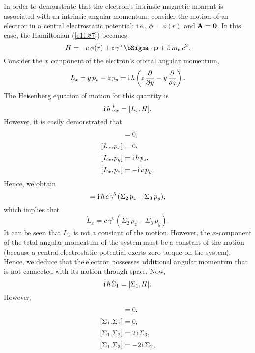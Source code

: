  In order to demonstrate that the electron's intrinsic magnetic moment is associated with an intrinsic angular momentum,
  consider the motion of an electron in a central electrostatic potential: i.e., $\phi=\phi(r)$ and ${\bf A}={\bf 0}$. 
In this case, the Hamiltonian (\ref{e11.87}) becomes
\begin{equation}
H = - e\,\phi(r) + c\,\gamma^5\,\bSigma\cdot{\bf p} + \beta\,m_e\,c^2.
\end{equation}
Consider the $x$ component of the electron's orbital angular momentum,
\begin{equation}
L_x = y\,p_z-z\,p_y = {\rm i}\,\hbar\left(z\,\frac{\partial}{\partial y} - y\,\frac{\partial}{\partial z}\right).
\end{equation}
The Heisenberg equation of motion for this quantity is
\begin{equation}
{\rm i}\,\hbar\,\dot{L}_x = [L_x,H].
\end{equation}
However, it is easily demonstrated that
\begin{align}
[L_x,r] &= 0,\\[0.5ex]
[L_x,p_x] &= 0,\\[0.5ex]
[L_x,p_y] &= {\rm i}\,\hbar\,p_z,\\[0.5ex]
[L_x,p_z]&=  -{\rm i}\,\hbar\,p_y.
\end{align}
Hence, we obtain
\begin{equation}
[L_x,H] = {\rm i}\,\hbar\,c\,\gamma^5\,(\Sigma_2\,p_z-\Sigma_3\,p_y),
\end{equation}
which implies that
\begin{equation}
\dot{L}_x = c\,\gamma^5\,(\Sigma_2\,p_z-\Sigma_3\,p_y).
\end{equation}
It can be seen that $L_x$ is not a constant of the motion. However, the $x$-component of the total angular
momentum of the system must be a constant of the motion (because a central electrostatic potential exerts zero torque on the system). Hence, we deduce that the electron possesses additional
angular momentum that is not connected with its motion through space. Now,
\begin{equation}
{\rm i}\,\hbar\,\dot{\Sigma}_1= [\Sigma_1,H].
\end{equation}
However,
\begin{align}
[\Sigma_1,\gamma^5] &= 0,\\[0.5ex]
[\Sigma_1,\Sigma_1] &=0,\\[0.5ex]
[\Sigma_1,\Sigma_2] &=2\,{\rm i}\,\Sigma_3,\\[0.5ex]
[\Sigma_1,\Sigma_3]&=-2\,{\rm i}\,\Sigma_2,
\end{align}
